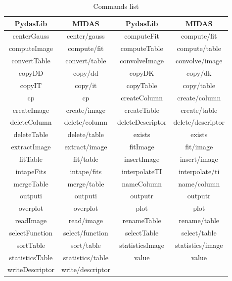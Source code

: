 \documentclass[11pt,twoside]{article}
\begin{document}
\begin{table}[!hb]
\begin{center}
\caption{Commands list}
\label{commands}
\begin{tabular}{cc||cc}
\hline
 PydasLib & MIDAS &PydasLib & MIDAS\\
\hline
\hline
 centerGauss & center/gauss &
computeFit & compute/fit \\
computeImage & compute/fit &
computeTable & compute/table\\
convertTable & convert/table  &
convolveImage & convolve/image\\
copyDD & copy/dd &
copyDK & copy/dk\\
copyIT & copy/it &
copyTable & copy/table\\
cp & cp &
createColumn & create/column\\
createImage & create/image &
createTable & create/table\\
deleteColumn & delete/column &
deleteDescriptor & delete/descriptor\\
deleteTable & delete/table &
exists & exists \\
extractImage & extract/image &
fitImage & fit/image\\
fitTable & fit/table &
insertImage & insert/image\\
intapeFits & intape/fits &
interpolateTI & interpolate/ti\\
mergeTable & merge/table &
nameColumn & name/column\\
outputi & outputi &
outputr & outputr\\
overplot & overplot &
plot & plot\\
readImage & read/image &
renameTable & rename/table\\
selectFunction & select/function &
selectTable & select/table\\
sortTable & sort/table &
statisticsImage & statistics/image\\
statisticsTable & statistics/table &
value &value \\
writeDescriptor & write/descriptor\\
\hline 
\hline
\end{tabular}
\end{center}
\end{table}
\end{document}
